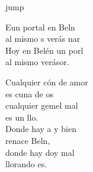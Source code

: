 \begin{cancion}[En un portal][]jump\\
	\begin{chorus}%
		Eun portal  en Beln\\
		al mismo s verás nar \\
		Hoy en Belén un porl \\
		al mismo  verásor.\jump\\
	\end{chorus}%
	Cualquier cón de amor\\
	es cuna de os\\
	cualquier gemel mal\\
	es un llo.\\
	\jump
	Donde hay a y bien\\
	renace Beln,\\
	donde hay doy mal\\
	llorando es.\\
\end{cancion}%
